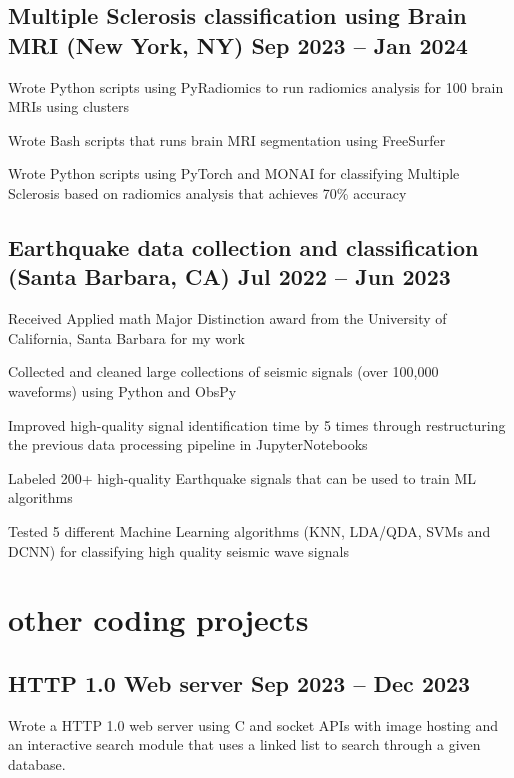 \documentclass[a4paper,12pt]{article}
\begin{document}
\subsection{ Multiple Sclerosis classification using Brain MRI	\hfill \textnormal{(New York, NY)} Sep 2023 -- Jan 2024}
\begin{zitemize}
\item Wrote Python scripts using PyRadiomics to run radiomics analysis for 100 brain MRIs using clusters
\item Wrote Bash scripts that runs brain MRI segmentation using FreeSurfer
\item Wrote Python scripts using PyTorch and MONAI for classifying Multiple Sclerosis based on radiomics analysis that achieves 70\% accuracy
\end{zitemize}
\subsection{Earthquake data collection and classification \hfill\textnormal{(Santa Barbara, CA)}	Jul 2022 -- Jun 2023}
\begin{zitemize}
\item Received Applied math Major Distinction award from the University of California, Santa Barbara for my work
\item Collected and cleaned large collections of seismic signals (over 100,000 waveforms) using Python and ObsPy
\item Improved high-quality signal identification time by 5 times through restructuring the previous data processing pipeline in JupyterNotebooks
\item Labeled 200+ high-quality Earthquake signals that can be used to train ML algorithms 
\item Tested 5 different Machine Learning algorithms (KNN, LDA/QDA, SVMs and DCNN) for classifying high quality seismic wave signals
\end{zitemize}
\section{other coding projects}
\subsection{HTTP 1.0 Web server \hfill	Sep 2023 -- Dec 2023}
\begin{zitemize}
\item Wrote a HTTP 1.0 web server using C and socket APIs with image hosting and an interactive search module that uses a linked list to search through a given database.
\end{zitemize}
\end{document}
